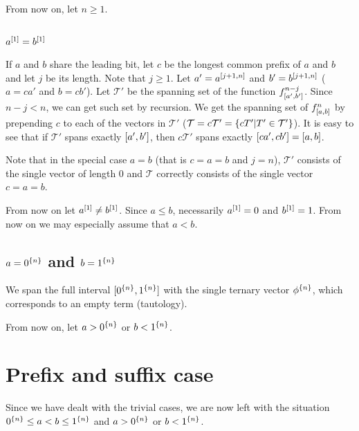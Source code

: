 From now on, let $n \geq 1$.

\subsection{\texorpdfstring{$a^{[1]} = b^{[1]}$}{ = }}
\label{sec:commonprefix}

If $a$ and $b$ share the leading bit,
let $c$ be the longest common prefix of $a$ and $b$
and let $j$ be its length.
Note that $j \geq 1$.
Let $a' = a^{[j+1, n]}$ and $b' = b^{[j+1, n]}$
($a = ca'$ and $b = cb'$).
Let $\mathcal{T}'$ be the spanning set of
the function $f^{n-j}_{[a', b']}$.
Since $n-j < n$,
we can get such set by recursion.
We get the spanning set of $f^{n}_{[a, b]}$
by prepending $c$
to each of the vectors in $\mathcal{T}'$
($\mathcal{T} = c \mathcal{T}'
= \{cT' | T' \in \mathcal{T}'\}$).
It is easy to see that if $\mathcal{T}'$
spans exactly $[a', b']$,
then $c \mathcal{T}'$ spans exactly
$[c a', c b'] = [a, b]$.

Note that in the special case $a=b$
(that is $c=a=b$ and $j=n$),
$\mathcal{T}'$ consists of the single vector of length $0$
and $\mathcal{T}$ correctly consists of the single vector $c=a=b$.

From now on let $a^{[1]} \neq b^{[1]}$.
Since $a \leq b$,
necessarily $a^{[1]} = 0$ and $b^{[1]} = 1$.
From now on we may especially assume that $a < b$.

\subsection{\texorpdfstring
{$a = 0^{\{n\}}$}{a = }
and
\texorpdfstring{$b = 1^{\{n\}}$}{b = }
}

We span the full interval
$[0^{\{n\}}, 1^{\{n\}}]$
with the single ternary vector $\phi^{\{n\}}$,
which corresponds to an empty term (tautology).

From now on,
let $a > 0^{\{n\}}$ or $b < 1^{\{n\}}$.

\section{Prefix and suffix case}
\label{sec:prefixsuffix}


Since we have dealt with the trivial cases,
we are now left with the situation
$0^{\{n\}} \leq a < b \leq 1^{\{n\}}$
and
$a > 0^{\{n\}}$ or $b < 1^{\{n\}}$.

